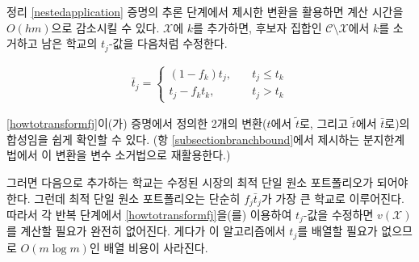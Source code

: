 \documentclass[11pt]{article} %
\newif\ifen
\theoremstyle{definition}
\theoremstyle{definition}
\begin{document}
\ifen 
We reduce the computation time to $O(hm)$ by taking advantage of the transformation from the inductive step in the proof of Theorem \ref{nestedapplication}. Once school $k$ is added to $\mathcal{X}$, we eliminate it from the set $\mathcal{C}\setminus \mathcal{X}$ of candidates, and update the $t_j$-values of the remaining schools according to the following relation.
\else
정리 \ref{nestedapplication} 증명의 추론 단계에서 제시한 변환을 활용하면 계산 시간을 $O(hm)$으로 감소시킬 수 있다. $\mathcal{X}$에 $k$를 추가하면, 후보자 집합인 $\mathcal{C}\setminus \mathcal{X}$에서 $k$를 소거하고 남은 학교의 $t_j$-값을 다음처럼 수정한다.
\fi
\begin{align}\label{howtotransformfj}
\bar t_j = 
\begin{cases}
(1 - f_k) t_j, \quad & t_j \leq t_k \\
t_j - f_k t_k, \quad& t_j > t_k
\end{cases}
\end{align}
\ifen
\noindent It is easy to verify that \eqref{howtotransformfj} is the composition of the two transformations (from $t$ to $\tilde t$, and from $\tilde t$ to $\bar t$) given in the proof. (We will reuse this transformation as a variable-elimination technique in the branch-and-bound algorithm presented in Subsection \ref{subsectionbranchbound}.)

Now, the \emph{next} school added must be the optimal singleton portfolio in the modified market. But the optimal singleton portfolio consists simply of the school with the highest value of $f_j \bar t_j$. Therefore, by updating the $t_j$-values at each iteration according to \eqref{howtotransformfj}, we eliminate the need to compute $v(\mathcal{X})$ entirely. Moreover, this algorithm does not require the schools to be indexed in ascending order by $t_j$, which removes the $O(m\log m)$ sorting cost.
\else
\noindent \eqref{howtotransformfj}이(가) 증명에서 정의한 2개의 변환($t$에서 $\tilde t$로, 그리고 $\tilde t$에서 $\bar t$로)의 합성임을 쉽게 확인할 수 있다. (항 \ref{subsectionbranchbound}에서 제시하는 분지한계법에서 이 변환을 변수 소거법으로 재활용한다.)

그러면 다음으로 추가하는 학교는 수정된 시장의 최적 단일 원소 포트폴리오가 되어야 한다. 그런데 최적 단일 원소 포트폴리오는 단순히 $f_j \bar t_j$가 가장 큰 학교로 이루어진다. 따라서 각 반복 단계에서 \eqref{howtotransformfj}을(를) 이용하여 $t_j$-값을 수정하면 $v(\mathcal{X})$를 계산할 필요가 완전히 없어진다. 게다가 이 알고리즘에서 $t_j$를 배열할 필요가 없으므로 $O(m\log m)$인 배열 비용이 사라진다. 
\fi
\end{document}
